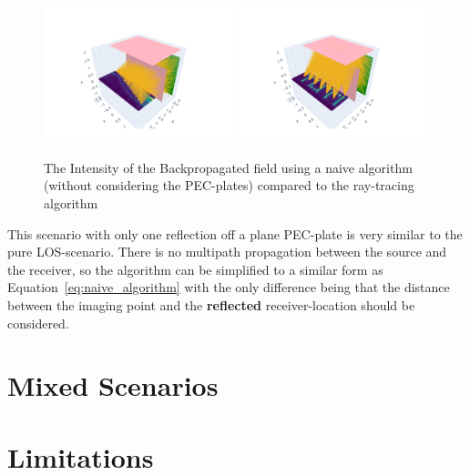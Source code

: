 \begin{figure}[ht]
    \centering
    \includegraphics[width=0.49\textwidth]{figures/nlos_naive_result.pdf}
    \includegraphics[width=0.49\textwidth]{figures/nlos_result.pdf}
    \caption{The Intensity of the Backpropagated field using a naive algorithm (without considering the PEC-plates) compared to the ray-tracing algorithm}\label{fig:nlos_results}
\end{figure}

This scenario with only one reflection off a plane PEC-plate is very similar to the pure LOS-scenario.
There is no multipath propagation between the source and the receiver, so the algorithm can be simplified to a similar form as Equation~\eqref{eq:naive_algorithm} with the only difference being that the distance between the imaging point and the \textbf{reflected} receiver-location should be considered.



\section{Mixed Scenarios}

\section{Limitations}